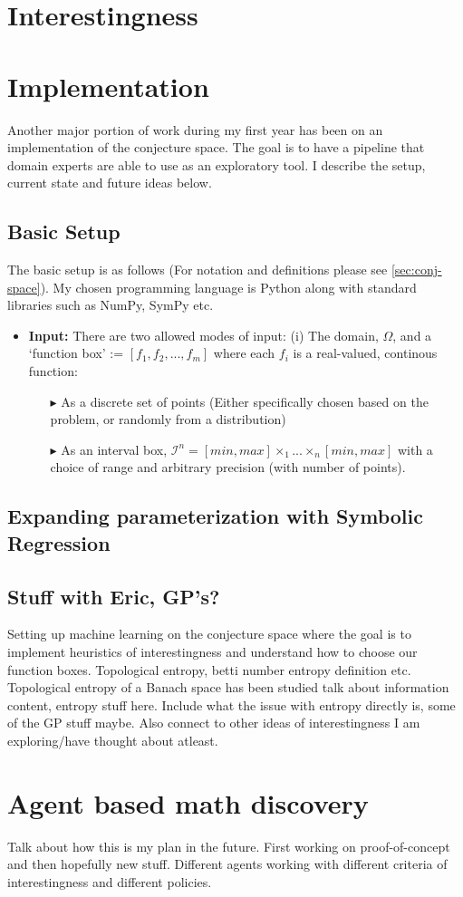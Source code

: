 \section{Interestingness}

\section{Implementation}
Another major portion of work during my first year has been on an implementation of the conjecture space. The goal is to have a pipeline that domain experts are able to use as an exploratory tool.
I describe the setup, current state and future ideas below.

\subsection{Basic Setup}
The basic setup is as follows (For notation and definitions please see \ref{sec:conj-space}). My chosen programming language is Python along with standard libraries such as NumPy, SymPy etc. 
\begin{itemize}
    \item \textbf{Input:} There are two allowed modes of input: (i) The domain, $\Omega$, and a `function box' := $[f_1, f_2,...,f_m]$ where each $f_i$ is a real-valued, continous function: 
          \begin{itemize}
            \item[$\blacktriangleright$] As a discrete set of points (Either specifically chosen based on the problem, or randomly from a distribution)
            \item[$\blacktriangleright$] As an interval box, $\mathcal{I}^n = [min, max]\times_1...\times_n[min, max]$ with a choice of range and arbitrary precision (with number of points).
          \end{itemize}
    
\end{itemize}
 

\subsection{Expanding parameterization with Symbolic Regression}
\subsection{Stuff with Eric, GP's?}
Setting up machine learning on the conjecture space where the goal is to implement heuristics of interestingness and understand how to choose our function boxes.
Topological entropy, betti number entropy definition etc. Topological entropy of a Banach space has been studied \cite{bobokTopologicalEntropyBanach2011}
talk about information content, entropy stuff here. Include what the issue with entropy directly is, some of the GP stuff maybe. Also connect to other ideas of interestingness I am exploring/have thought about atleast.

\section{Agent based math discovery}
Talk about how this is my plan in the future. First working on proof-of-concept and then hopefully new stuff.
Different agents working with different criteria of interestingness and different policies.

